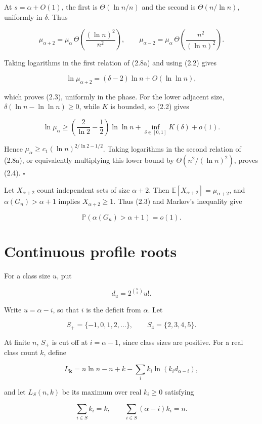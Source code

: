 \documentclass[11pt,reqno]{amsart}
\newcommand{\Prob}[1]{\mathbb{P}\!\left(#1\right)}
\newcommand{\Exp}[1]{\mathbb{E}\!\left[#1\right]}
\begin{document}
At \(s=\alpha+O(1)\), the first is \(\Theta({\ln n}/n)\) and the
second is \(\Theta(n/{\ln n})\), uniformly in \(\delta\).  Thus

\[
 \mu_{\alpha+2}
 =\mu_\alpha\,\Theta\!\left(\frac{(\ln n)^2}{n^2}\right),
 \qquad
 \mu_{\alpha-2}
 =\mu_\alpha\,\Theta\!\left(\frac{n^2}{(\ln n)^2}\right). \tag{2.8a}
\]

Taking logarithms in the first relation of (2.8a) and using (2.2) gives

\[
 \ln\mu_{\alpha+2}
 =(\delta-2)\ln n+O(\ln\ln n),
\]

which proves (2.3), uniformly in the phase. For the lower adjacent size,
\(\delta(\ln n-\ln\ln n)\ge0\), while \(K\) is bounded, so (2.2) gives

\[
 \ln\mu_\alpha
 \ge\left(\frac2{\ln 2}-\frac12\right)\ln\ln n
   +\inf_{\delta\in[0,1]}K(\delta)+o(1).
\]

Hence \(\mu_{\alpha}\ge c_1(\ln n)^{2/{\ln 2}-1/2}\).
Taking logarithms in the second relation of (2.8a), or equivalently
multiplying this lower bound by \(\Theta(n^2/(\ln n)^2)\), proves
(2.4). \(\square\)

Let \(X_{\alpha+2}\) count independent sets of size \(\alpha+2\).
Then \(\Exp{X_{\alpha+2}}=\mu_{\alpha+2}\), and
\(\alpha(G_n)>\alpha+1\) implies \(X_{\alpha+2}\ge1\).
Thus (2.3) and Markov's inequality give

\[
 \Prob{\alpha(G_n)>\alpha+1}=o(1).                       \tag{2.9}
\]

\section{Continuous profile roots}\label{continuous-profile-roots}

For a class size \(u\), put

\[
 d_u=2^{\binom u2}u!.
\]

Write \(u=\alpha-i\), so that \(i\) is the deficit from
\(\alpha\). Let

\[
 S_+=\{-1,0,1,2,\ldots\},\qquad S_4=\{2,3,4,5\}.         \tag{3.1}
\]

At finite \(n\), \(S_+\) is cut off at \(i=\alpha-1\),
since class sizes are positive. For a real class count \(k\),
define

\[
 L_{\mathbf k}=n{\ln n}-n+k-\sum_i k_i\ln(k_id_{\alpha-i}),    \tag{3.2}
\]

and let \(L_S(n,k)\) be its maximum over real
\(k_i\ge 0\) satisfying

\[
 \sum_{i\in S}k_i=k,\qquad
 \sum_{i\in S}(\alpha-i)k_i=n.                           \tag{3.3}
\]
\end{document}
